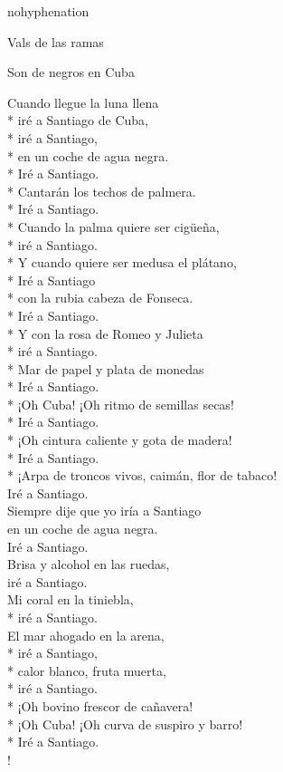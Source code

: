 \documentclass[
    a5paper,
    DIV=10,
    12pt,
    notitlepage,
    oneside,]
{scrbook} %
\begin{document}
\begin{hyphenrules}{nohyphenation}
\begin{poem}{Vals de las ramas}{}{\vspace{-1em}}
\end{poem}


\begin{poem}{Son de negros en Cuba}{}{}

Cuando llegue la luna llena\\*
iré a Santiago de Cuba,\\*
iré a Santiago,\\*
en un coche de agua negra.\\*
Iré a Santiago.\\*
Cantarán los techos de palmera.\\*
Iré a Santiago.\\*
Cuando la palma quiere ser cigüeña,\\*
iré a Santiago.\\*
Y cuando quiere ser medusa el plátano,\\*
Iré a Santiago\\*
con la rubia cabeza de Fonseca.\\*
Iré a Santiago.\\*
Y con la rosa de Romeo y Julieta\\*
iré a Santiago.\\*
Mar de papel y plata de monedas\\*
Iré a Santiago.\\*
¡Oh Cuba! ¡Oh ritmo de semillas secas!\\*
Iré a Santiago.\\*
¡Oh cintura caliente y gota de madera!\\*
Iré a Santiago.\\*
¡Arpa de troncos vivos, caimán, flor de tabaco!\\
Iré a Santiago.\\
Siempre dije que yo iría a Santiago\\
en un coche de agua negra.\\
Iré a Santiago.\\
Brisa y alcohol en las ruedas,\\
iré a Santiago.\\
Mi coral en la tiniebla,\\*
iré a Santiago.\\

El mar ahogado en la arena,\\*
iré a Santiago,\\*
calor blanco, fruta muerta,\\*
iré a Santiago.\\*
¡Oh bovino frescor de cañavera!\\*
¡Oh Cuba! ¡Oh curva de suspiro y barro!\\*
Iré a Santiago.\\!


\end{poem}
\end{hyphenrules}
\end{document}
